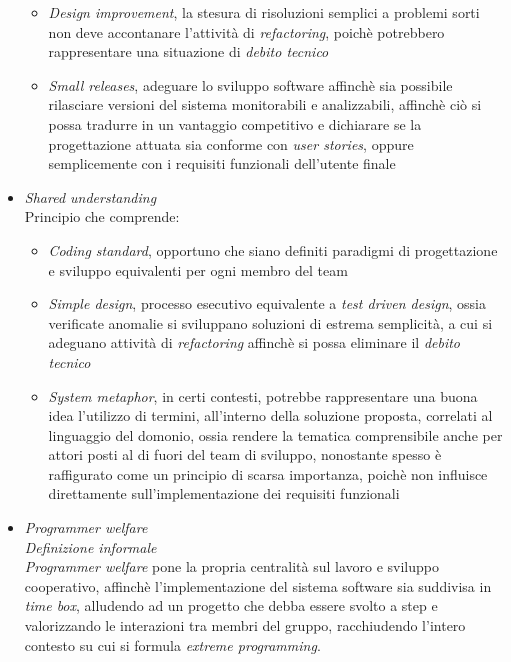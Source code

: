 \documentclass{article}
\begin{document}
\begin{itemize}[label={-}]
\begin{itemize}
        \item \textit{Design improvement}, la stesura di risoluzioni semplici a problemi sorti non deve accontanare l'attività di \textit{refactoring}, poichè potrebbero rappresentare una situazione di \textit{debito tecnico}
        \item \textit{Small releases}, adeguare lo sviluppo software affinchè sia possibile rilasciare versioni del sistema monitorabili e analizzabili, affinchè ciò si possa tradurre in un vantaggio competitivo e dichiarare se la progettazione attuata sia conforme con \textit{user stories}, oppure semplicemente con i requisiti funzionali dell'utente finale
    \end{itemize}
    \item \textit{Shared understanding}\vspace*{7pt}\\
    Principio che comprende:
    \begin{itemize}
        \item \textit{Coding standard}, opportuno che siano definiti paradigmi di progettazione e sviluppo equivalenti per ogni membro del team 
        \item \textit{Simple design}, processo esecutivo equivalente a \textit{test driven design}, ossia verificate anomalie si sviluppano soluzioni di estrema semplicità, a cui si adeguano attività di \textit{refactoring} affinchè si possa eliminare il \textit{debito tecnico} 
        \item \textit{System metaphor}, in certi contesti, potrebbe rappresentare una buona idea l'utilizzo di termini, all'interno della soluzione proposta, correlati al linguaggio del domonio, ossia rendere la tematica comprensibile anche per attori posti al di fuori del team di sviluppo, nonostante spesso è raffigurato come un principio di scarsa importanza, poichè non influisce direttamente sull'implementazione dei requisiti funzionali
    \end{itemize}
    \item \textit{Programmer welfare}\vspace*{7pt}\\
    \textit{Definizione informale}\\
    \textit{Programmer welfare} pone la propria centralità sul lavoro e sviluppo cooperativo, affinchè l'implementazione del sistema software sia suddivisa in \textit{time box}, alludendo ad un progetto che debba essere svolto a step e valorizzando le interazioni tra membri del gruppo, racchiudendo l'intero contesto su cui si formula \textit{extreme programming}.
\end{itemize}
\end{document}
